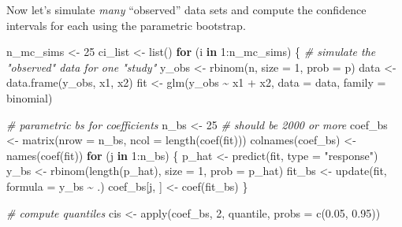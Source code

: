 \documentclass[
]{book}
\newenvironment{Shaded}{\begin{snugshade}}{\end{snugshade}}
\newcommand{\AttributeTok}[1]{\textcolor[rgb]{0.77,0.63,0.00}{#1}}
\newcommand{\CommentTok}[1]{\textcolor[rgb]{0.56,0.35,0.01}{\textit{#1}}}
\newcommand{\ControlFlowTok}[1]{\textcolor[rgb]{0.13,0.29,0.53}{\textbf{#1}}}
\newcommand{\DecValTok}[1]{\textcolor[rgb]{0.00,0.00,0.81}{#1}}
\newcommand{\FloatTok}[1]{\textcolor[rgb]{0.00,0.00,0.81}{#1}}
\newcommand{\FunctionTok}[1]{\textcolor[rgb]{0.00,0.00,0.00}{#1}}
\newcommand{\NormalTok}[1]{#1}
\newcommand{\OtherTok}[1]{\textcolor[rgb]{0.56,0.35,0.01}{#1}}
\newcommand{\SpecialCharTok}[1]{\textcolor[rgb]{0.00,0.00,0.00}{#1}}
\newcommand{\StringTok}[1]{\textcolor[rgb]{0.31,0.60,0.02}{#1}}
\begin{document}
Now let's simulate \emph{many} ``observed'' data sets and compute the
confidence intervals for each using the parametric bootstrap.

\begin{Shaded}
\begin{Highlighting}[]
\NormalTok{n\_mc\_sims }\OtherTok{\textless{}{-}} \DecValTok{25}
\NormalTok{ci\_list }\OtherTok{\textless{}{-}} \FunctionTok{list}\NormalTok{()}
\ControlFlowTok{for}\NormalTok{ (i }\ControlFlowTok{in} \DecValTok{1}\SpecialCharTok{:}\NormalTok{n\_mc\_sims) \{}
  \CommentTok{\# simulate the "observed" data for one "study"}
\NormalTok{  y\_obs }\OtherTok{\textless{}{-}} \FunctionTok{rbinom}\NormalTok{(n, }\AttributeTok{size =} \DecValTok{1}\NormalTok{, }\AttributeTok{prob =}\NormalTok{ p)}
\NormalTok{  data }\OtherTok{\textless{}{-}} \FunctionTok{data.frame}\NormalTok{(y\_obs, x1, x2)}
\NormalTok{  fit }\OtherTok{\textless{}{-}} \FunctionTok{glm}\NormalTok{(y\_obs }\SpecialCharTok{\textasciitilde{}}\NormalTok{ x1 }\SpecialCharTok{+}\NormalTok{ x2, }\AttributeTok{data =}\NormalTok{ data, }\AttributeTok{family =}\NormalTok{ binomial)}
  
  \CommentTok{\# parametric bs for coefficients}
\NormalTok{  n\_bs }\OtherTok{\textless{}{-}} \DecValTok{25}  \CommentTok{\# should be 2000 or more}
\NormalTok{  coef\_bs }\OtherTok{\textless{}{-}} \FunctionTok{matrix}\NormalTok{(}\AttributeTok{nrow =}\NormalTok{ n\_bs, }\AttributeTok{ncol =} \FunctionTok{length}\NormalTok{(}\FunctionTok{coef}\NormalTok{(fit)))}
  \FunctionTok{colnames}\NormalTok{(coef\_bs) }\OtherTok{\textless{}{-}} \FunctionTok{names}\NormalTok{(}\FunctionTok{coef}\NormalTok{(fit))}
  \ControlFlowTok{for}\NormalTok{ (j }\ControlFlowTok{in} \DecValTok{1}\SpecialCharTok{:}\NormalTok{n\_bs) \{}
\NormalTok{    p\_hat }\OtherTok{\textless{}{-}} \FunctionTok{predict}\NormalTok{(fit, }\AttributeTok{type =} \StringTok{"response"}\NormalTok{)}
\NormalTok{    y\_bs }\OtherTok{\textless{}{-}} \FunctionTok{rbinom}\NormalTok{(}\FunctionTok{length}\NormalTok{(p\_hat), }\AttributeTok{size =} \DecValTok{1}\NormalTok{, }\AttributeTok{prob =}\NormalTok{ p\_hat)}
\NormalTok{    fit\_bs }\OtherTok{\textless{}{-}} \FunctionTok{update}\NormalTok{(fit, }\AttributeTok{formula =}\NormalTok{ y\_bs }\SpecialCharTok{\textasciitilde{}}\NormalTok{ .)}
\NormalTok{    coef\_bs[j, ] }\OtherTok{\textless{}{-}} \FunctionTok{coef}\NormalTok{(fit\_bs)}
\NormalTok{  \}}
  
  \CommentTok{\# compute quantiles}
\NormalTok{  cis }\OtherTok{\textless{}{-}} \FunctionTok{apply}\NormalTok{(coef\_bs, }\DecValTok{2}\NormalTok{, quantile, }\AttributeTok{probs =} \FunctionTok{c}\NormalTok{(}\FloatTok{0.05}\NormalTok{, }\FloatTok{0.95}\NormalTok{))}
  

\end{Highlighting}
\end{Shaded}
\end{document}
